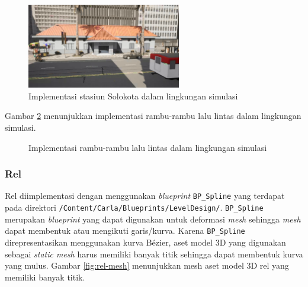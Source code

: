 \begin{figure}[!h]
    \centering
    \includegraphics[width=0.6\textwidth]{resources/chapter-4/stasiun-solokota-carla.png}
    \caption{Implementasi stasiun Solokota dalam lingkungan simulasi}
    \label{fig:stasiun-solokota}
\end{figure}

Gambar \ref{fig:road-signs} menunjukkan implementasi rambu-rambu lalu lintas
dalam lingkungan simulasi.

\begin{figure}[!h]
    \centering
    \hfill
    \caption{Implementasi rambu-rambu lalu lintas dalam lingkungan simulasi}
    \label{fig:road-signs}
\end{figure}

\subsubsection{Rel}

Rel diimplementasi dengan menggunakan \textit{blueprint} \verb|BP_Spline| yang
terdapat pada direktori \verb|/Content/Carla/Blueprints/LevelDesign/|.
\verb|BP_Spline| merupakan \textit{blueprint} yang dapat digunakan untuk
deformasi \textit{mesh} sehingga \textit{mesh} dapat membentuk atau mengikuti
garis/kurva. Karena \verb|BP_Spline| direpresentasikan menggunakan kurva Bézier,
aset model 3D yang digunakan sebagai \textit{static mesh} harus memiliki banyak
titik sehingga dapat membentuk kurva yang mulus. Gambar \ref{fig:rel-mesh}
menunjukkan mesh aset model 3D rel yang memiliki banyak titik.

